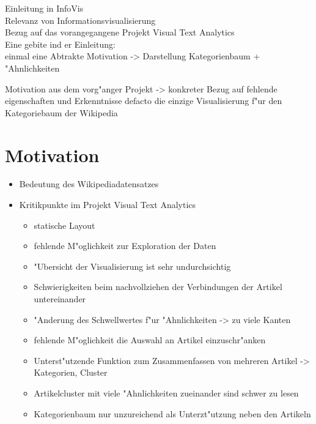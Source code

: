 
Einleitung in InfoVis\\
Relevanz von Informationsvisualisierung\\
Bezug auf das vorangegangene Projekt Visual Text Analytics\\
Eine gebite ind er Einleitung:\\
einmal eine Abtrakte Motivation -> Darstellung Kategorienbaum + "Ahnlichkeiten

Motivation aus dem vorg"anger Projekt -> konkreter Bezug auf fehlende eigenschaften und Erkenntnisse
defacto die einzige Visualisierung f"ur den Kategoriebaum der Wikipedia


\section{Motivation}
\begin{itemize}
  \item Bedeutung des Wikipediadatensatzes
  \item Kritikpunkte im Projekt Visual Text Analytics
  \begin{itemize}
    \item statische Layout
    \item fehlende M"oglichkeit zur Exploration der Daten
    \item "Ubersicht der Visualisierung ist sehr undurchsichtig
    \item Schwierigkeiten beim nachvollziehen der Verbindungen der Artikel untereinander
    \item "Anderung des Schwellwertes f"ur "Ahnlichkeiten -> zu viele Kanten
    \item fehlende M"oglichkeit die Auswahl an Artikel einzuschr"anken
    \item Unterst"utzende Funktion zum Zusammenfassen von mehreren Artikel -> Kategorien, Cluster
    \item Artikelcluster mit viele "Ahnlichkeiten zueinander sind schwer zu lesen
    \item Kategorienbaum nur unzureichend als Unterzt"utzung neben den Artikeln
  \end{itemize}
\end{itemize}


